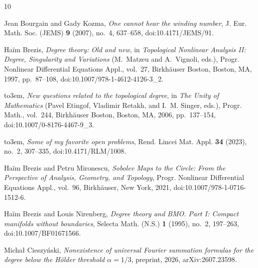 \documentclass[11pt]{amsart}
\theoremstyle{definition}
\theoremstyle{remark}
\begin{document}
\providecommand{\bysame}{\leavevmode\hbox to3em{\hrulefill}\thinspace}
\providecommand{\MR}{\relax\ifhmode\unskip\space\fi MR }
\providecommand{\MRhref}[2]{%
  \href{http://www.ams.org/mathscinet-getitem?mr=#1}{#2}
}
\providecommand{\href}[2]{#2}
\begin{thebibliography}{10}

Jean Bourgain and Gady Kozma, \emph{One cannot hear the winding number},
J. Eur. Math. Soc. (JEMS) \textbf{9} (2007), no.~4, 637--658,
\href{https://doi.org/10.4171/JEMS/91}{doi:10.4171/JEMS/91}.

Ha{\"i}m Brezis, \emph{Degree theory: Old and new}, in
\emph{Topological Nonlinear Analysis II: Degree, Singularity and Variations}
(M.~Matzeu and A.~Vignoli, eds.), Progr. Nonlinear Differential Equations
Appl., vol.~27, Birkh\"auser Boston, Boston, MA, 1997, pp.~87--108,
\href{https://doi.org/10.1007/978-1-4612-4126-3_2}{doi:10.1007/978-1-4612-4126-3\_2}.

\bysame, \emph{New questions related to the topological degree}, in
\emph{The Unity of Mathematics} (Pavel Etingof, Vladimir Retakh, and
I.~M. Singer, eds.), Progr. Math., vol.~244, Birkh{\"a}user Boston,
Boston, MA, 2006, pp.~137--154,
\href{https://doi.org/10.1007/0-8176-4467-9_3}{doi:10.1007/0-8176-4467-9\_3}.

\bysame, \emph{Some of my favorite open problems}, Rend. Lincei Mat. Appl.
\textbf{34} (2023), no.~2, 307--335,
\href{https://doi.org/10.4171/RLM/1008}{doi:10.4171/RLM/1008}.

Ha{\"i}m Brezis and Petru Mironescu,
\emph{Sobolev Maps to the Circle: From the Perspective of Analysis, Geometry,
and Topology}, Progr. Nonlinear Differential Equations Appl., vol.~96,
Birkh\"auser, New York, 2021,
\href{https://doi.org/10.1007/978-1-0716-1512-6}{doi:10.1007/978-1-0716-1512-6}.

Ha{\"i}m Brezis and Louis Nirenberg, \emph{Degree theory and {BMO}. Part {I}:
Compact manifolds without boundaries}, Selecta Math. (N.S.) \textbf{1}
(1995), no.~2, 197--263,
\href{https://doi.org/10.1007/BF01671566}{doi:10.1007/BF01671566}.

Micha{\l} Cieszy{\'n}ski,
\emph{Nonexistence of universal Fourier summation formulas for the degree
below the H\"older threshold $\alpha=1/3$},
preprint, 2026,
\href{https://arxiv.org/abs/2607.23598}{arXiv:2607.23598}.


\end{thebibliography}
\end{document}
